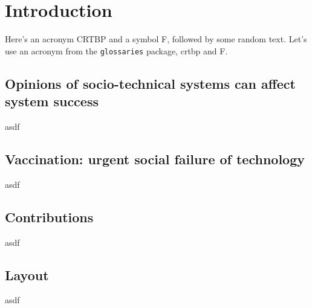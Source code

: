 
\chapter{Introduction} \label{chap:intro}

Here's an acronym \ac{CRTBP} and a symbol \ac{F}, followed by some random text.
Let's use an acronym from the \texttt{glossaries} package, \acrfull{crtbp} and \gls{F}.

\section{Opinions of socio-technical systems can affect system success}
asdf
\section{Vaccination: urgent social failure of technology}
asdf
\section{Contributions}
asdf
\section{Layout}
asdf